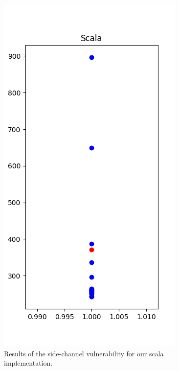 \begin{figure}
\includegraphics[width=.7\linewidth]{figures/scala.png}
\caption{Results of the side-channel vulnerability for our scala implementation.}
\end{figure}

